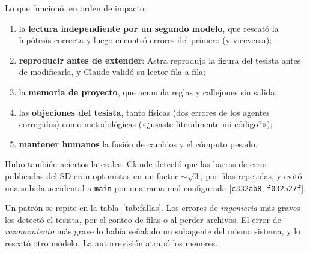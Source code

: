 \documentclass[11pt,a4paper]{article}
\newcommand{\ev}[1]{{\small\color{nota}[#1]}}   %
\newcommand{\code}[1]{\texttt{#1}}
\begin{document}
Lo que funcionó, en orden de impacto:
\begin{enumerate}[label=(\roman*)]
  \item la \textbf{lectura independiente por un segundo modelo}, que rescató la hipótesis correcta y luego
  encontró errores del primero (y viceversa);
  \item \textbf{reproducir antes de extender}: Astra reprodujo la figura del tesista antes de modificarla, y
  Claude validó su lector fila a fila;
  \item la \textbf{memoria de proyecto}, que acumula reglas y callejones sin salida;
  \item las \textbf{objeciones del tesista}, tanto físicas (dos errores de los agentes corregidos) como
  metodológicas («¿usaste literalmente mi código?»);
  \item \textbf{mantener humanos} la fusión de cambios y el cómputo pesado.
\end{enumerate}
Hubo también aciertos laterales. Claude detectó que las barras de error publicadas del SD eran optimistas en
un factor $\sim\sqrt{3}$, por filas repetidas, y evitó una subida accidental a \code{main} por una rama mal
configurada \ev{\code{c332ab8}; \code{f032527f}}.

Un patrón se repite en la tabla~\ref{tab:fallas}. Los errores de \emph{ingeniería} más graves los detectó el
tesista, por el conteo de filas o al perder archivos. El error de \emph{razonamiento} más grave lo había
señalado un subagente del mismo sistema, y lo rescató otro modelo. La autorrevisión atrapó los menores.

\end{document}
